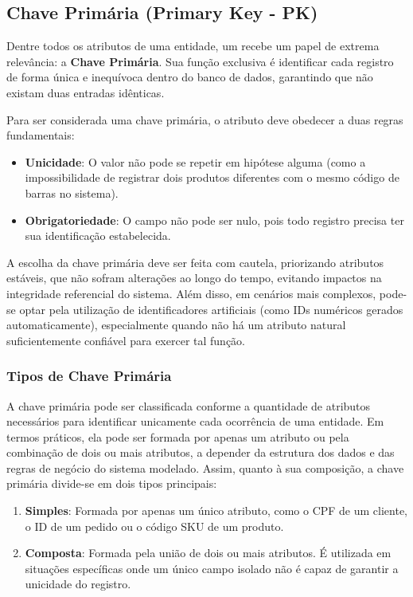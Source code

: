\subsection{Chave Primária (Primary Key - PK)}

Dentre todos os atributos de uma entidade, um recebe um papel de extrema relevância: a \textbf{Chave Primária}. Sua função exclusiva é identificar cada registro de forma única e inequívoca dentro do banco de dados, garantindo que não existam duas entradas idênticas.

Para ser considerada uma chave primária, o atributo deve obedecer a duas regras fundamentais:
\begin{itemize}
    \item \textbf{Unicidade}: O valor não pode se repetir em hipótese alguma (como a impossibilidade de registrar dois produtos diferentes com o mesmo código de barras no sistema).
    \item \textbf{Obrigatoriedade}: O campo não pode ser nulo, pois todo registro precisa ter sua identificação estabelecida.
\end{itemize}

A escolha da chave primária deve ser feita com cautela, priorizando atributos estáveis, que não sofram alterações ao longo do tempo, evitando impactos na integridade referencial do sistema. Além disso, em cenários mais complexos, pode-se optar pela utilização de identificadores artificiais (como IDs numéricos gerados automaticamente), especialmente quando não há um atributo natural suficientemente confiável para exercer tal função.

\subsubsection{Tipos de Chave Primária}
A chave primária pode ser classificada conforme a quantidade de atributos necessários para identificar unicamente cada ocorrência de uma entidade. Em termos práticos, ela pode ser formada por apenas um atributo ou pela combinação de dois ou mais atributos, a depender da estrutura dos dados e das regras de negócio do sistema modelado. Assim, quanto à sua composição, a chave primária divide-se em dois tipos principais: 

\begin{enumerate}
    \item \textbf{Simples}: Formada por apenas um único atributo, como o CPF de um cliente, o ID de um pedido ou o código SKU de um produto.
    \item \textbf{Composta}: Formada pela união de dois ou mais atributos. É utilizada em situações específicas onde um único campo isolado não é capaz de garantir a unicidade do registro.
\end{enumerate}


